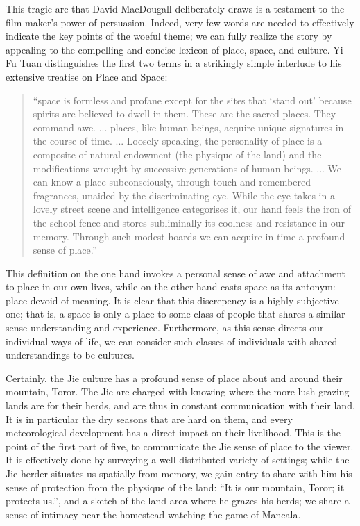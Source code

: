 \documentclass[12pt, letterpaper, oneside]{article}
\begin{document}
This tragic arc that David MacDougall deliberately draws is a testament to the film maker's power of persuasion. Indeed, very few words are needed to effectively indicate the key points of the woeful theme; we can fully realize the story by appealing to the compelling and concise lexicon of place, space, and culture. Yi-Fu Tuan distinguishes the first two terms in a strikingly simple interlude to his extensive treatise on Place and Space:
\begin{quote}
``space is formless and profane except for the sites that `stand out' because spirits are believed to dwell in them. These are the sacred places. They command awe. ... places, like human beings, acquire unique signatures in the course of time. ... Loosely speaking, the personality of place is a composite of natural endowment (the physique of the land) and the modifications wrought by successive generations of human beings. ... We can know a place subconsciously, through touch and remembered fragrances, unaided by the discriminating eye. While the eye takes in a lovely street scene and intelligence categorises it, our hand feels the iron of the school fence and stores subliminally its coolness and resistance in our memory. Through such modest hoards we can acquire in time a profound sense of place.''
\end{quote}
This definition on the one hand invokes a personal sense of awe and attachment to place in our own lives, while on the other hand casts space as its antonym: place devoid of meaning. It is clear that this discrepency is a highly subjective one; that is, a space is only a place to some class of people that shares a similar sense understanding and experience. Furthermore, as this sense directs our individual ways of life, we can consider such classes of individuals with shared understandings to be cultures.

Certainly, the Jie culture has a profound sense of place about and around their mountain, Toror. The Jie are charged with knowing where the more lush grazing lands are for their herds, and are thus in constant communication with their land. It is in particular the dry seasons that are hard on them, and every meteorological development has a direct impact on their livelihood. This is the point of the first part of five, to communicate the Jie sense of place to the viewer. It is effectively done by surveying a well distributed variety of settings; while the Jie herder situates us spatially from memory, we gain entry to share with him his sense of protection from the physique of the land: ``It is our mountain, Toror; it protects us.'', and a sketch of the land area where he grazes his herds; we share a sense of intimacy near the homestead watching the game of Mancala.
\end{document}
